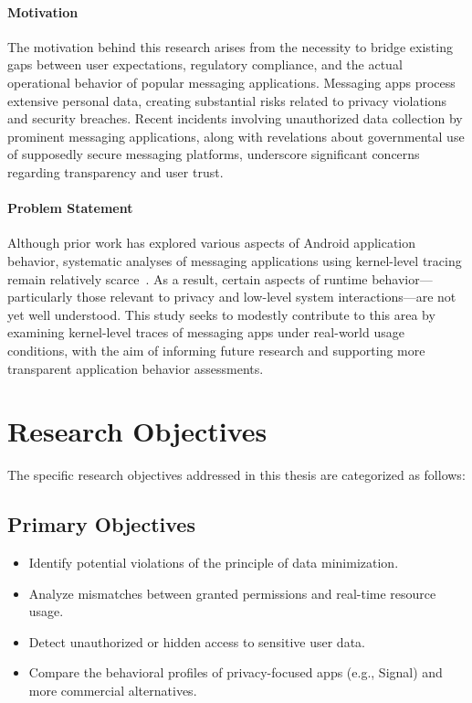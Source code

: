 \documentclass[a4paper,12pt]{report}
\begin{document}
\paragraph{Motivation}
The motivation behind this research arises from the necessity to bridge existing
gaps between user expectations, regulatory compliance, and the actual operational
behavior of popular messaging applications. Messaging apps process extensive personal
data, creating substantial risks related to privacy violations and security breaches.
Recent incidents involving unauthorized data collection by prominent messaging
applications, along with revelations about governmental use of supposedly secure
messaging platforms, underscore significant concerns regarding transparency
and user trust.

\paragraph{Problem Statement}

Although prior work has explored various aspects of Android application behavior,
systematic analyses of messaging applications using kernel-level tracing remain
relatively scarce~\cite{DynamicSecurityAnalysis2023}. As a result, certain aspects
of runtime behavior—particularly those relevant to privacy and low-level system
interactions—are not yet well understood. This study seeks to modestly contribute
to this area by examining kernel-level traces of messaging apps under real-world
usage conditions, with the aim of informing future research and supporting more
transparent application behavior assessments.

\section{Research Objectives}

The specific research objectives addressed in this thesis are categorized as follows:

\subsection*{Primary Objectives}
\begin{itemize}
\item Identify potential violations of the principle of data minimization.
\item Analyze mismatches between granted permissions and real-time resource usage.
\item Detect unauthorized or hidden access to sensitive user data.
\item Compare the behavioral profiles of privacy-focused apps (e.g., Signal)
and more commercial alternatives.
\end{itemize}
\end{document}
